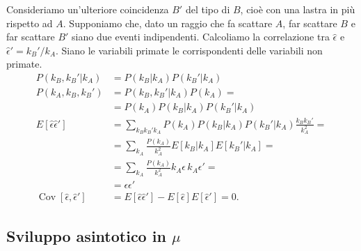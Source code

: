 Consideriamo un'ulteriore coincidenza $B'$ del tipo di $B$,
cioè con una lastra in più rispetto ad $A$.
Supponiamo che, dato un raggio che fa scattare $A$,
far scattare $B$ e far scattare $B'$ siano due eventi indipendenti.
Calcoliamo la correlazione tra $\hat\epsilon$ e $\hat\epsilon'=k_B'/k_A$.
Siano le variabili primate le corrispondenti delle variabili non primate.
\begin{align*}
	P(k_B,k_B'|k_A)
	&= P(k_B|k_A) P(k_B'|k_A) \\
	P(k_A,k_B,k_B')
	&= P(k_B,k_B'|k_A) P(k_A) = \\
	&= P(k_A) P(k_B|k_A) P(k_B'|k_A) \\
	E[\hat\epsilon \hat\epsilon']
	&= \sum_{k_Bk_B'k_A} P(k_A) P(k_B|k_A) P(k_B'|k_A) \frac{k_Bk_B'}{k_A^2} = \\
	&= \sum_{k_A} \frac{P(k_A)}{k_A^2} E[k_B|k_A] E[k_B'|k_A] = \\
	&= \sum_{k_A} \frac{P(k_A)}{k_A^2} k_A\epsilon\,k_A\epsilon' = \\
	&= \epsilon\epsilon' \\
	\operatorname{Cov}[\hat\epsilon,\hat\epsilon']
	&= E[\hat\epsilon\hat\epsilon'] - E[\hat\epsilon]E[\hat\epsilon'] = 0.
\end{align*}

\subsection{Sviluppo asintotico in $\mu$}
\label{sec:asintmu}

